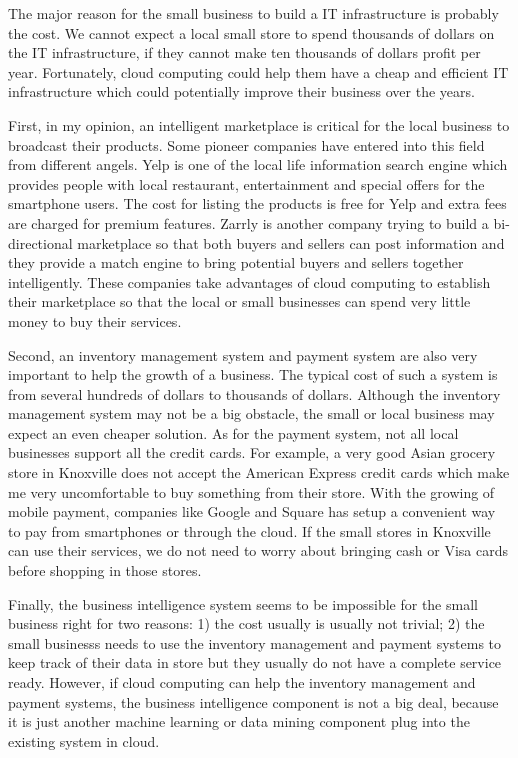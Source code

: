 The major reason for the small business to build a IT infrastructure is probably the cost. We cannot expect a local small store to spend thousands of dollars on the IT infrastructure, if they cannot make ten thousands of dollars profit per year. Fortunately, cloud computing could help them have a cheap and efficient IT infrastructure which could potentially improve their business over the years. 

First, in my opinion, an intelligent marketplace is critical for the local business to broadcast their products. Some pioneer companies have entered into this field from different angels. Yelp is one of the local life information search engine which provides people with local restaurant, entertainment and special offers for the smartphone users. The cost for listing the products is free for Yelp and extra fees are charged for premium features. Zarrly is another company trying to build a bi-directional marketplace so that both buyers and sellers can post information and they provide a match engine to bring potential buyers and sellers together intelligently. These companies take advantages of cloud computing to establish their marketplace so that the local or small businesses can spend very little money to buy their services. 

Second, an inventory management system and payment system are also very important to help the growth of a business. The typical cost of such a system is from several hundreds of dollars to thousands of dollars. Although the inventory management system may not be a big obstacle, the small or local business may expect an even cheaper solution. As for the payment system, not all local businesses support all the credit cards. For example, a very good Asian grocery store in Knoxville does not accept the American Express credit cards which make me very uncomfortable to buy something from their store. With the growing of mobile payment, companies like Google and Square has setup a convenient way to pay from smartphones or through the cloud. If the small stores in Knoxville can use their services, we do not need to worry about bringing cash or Visa cards before shopping in those stores.

Finally, the business intelligence system seems to be impossible for the small business right for two reasons: 1) the cost usually is usually not trivial; 2) the small businesss needs to use the inventory management and payment systems to keep track of their data in store but they usually do not have a complete service ready. However, if cloud computing can help the inventory management and payment systems, the business intelligence component is not a big deal, because it is just another machine learning or data mining component plug into the existing system in cloud.

